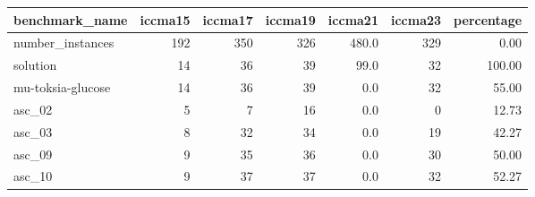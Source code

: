 \begin{tabular}{lrrrrrr}
\toprule
benchmark\_name &  iccma15 &  iccma17 &  iccma19 &  iccma21 &  iccma23 &  percentage \\
\midrule
number\_instances  &      192 &      350 &      326 &    480.0 &      329 &        0.00 \\
solution          &       14 &       36 &       39 &     99.0 &       32 &      100.00 \\
mu-toksia-glucose &       14 &       36 &       39 &      0.0 &       32 &       55.00 \\
asc\_02            &        5 &        7 &       16 &      0.0 &        0 &       12.73 \\
asc\_03            &        8 &       32 &       34 &      0.0 &       19 &       42.27 \\
asc\_09            &        9 &       35 &       36 &      0.0 &       30 &       50.00 \\
asc\_10            &        9 &       37 &       37 &      0.0 &       32 &       52.27 \\
\bottomrule
\end{tabular}
